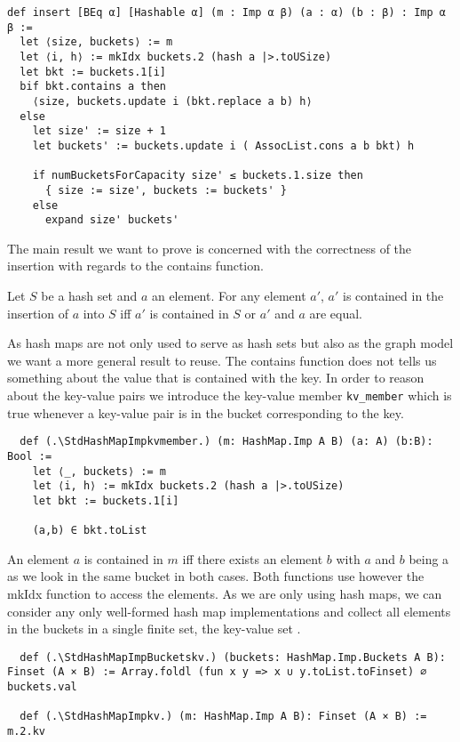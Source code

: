 \begin{lstlisting}
def insert [BEq α] [Hashable α] (m : Imp α β) (a : α) (b : β) : Imp α β :=
  let ⟨size, buckets⟩ := m
  let ⟨i, h⟩ := mkIdx buckets.2 (hash a |>.toUSize)
  let bkt := buckets.1[i]
  bif bkt.contains a then
    ⟨size, buckets.update i (bkt.replace a b) h⟩
  else
    let size' := size + 1
    let buckets' := buckets.update i ( AssocList.cons a b bkt) h

    if numBucketsForCapacity size' ≤ buckets.1.size then
      { size := size', buckets := buckets' }
    else
      expand size' buckets'
\end{lstlisting}

The main result we want to prove is concerned with the correctness of the insertion with regards to the contains function.

\begin{lemma}[\StdHashSetcontainsinsert]
  Let $S$ be a hash set and $a$ an element. For any element $a'$, $a'$ is contained in the insertion of $a$ into $S$ iff $a'$ is contained in $S$ or $a'$ and $a$ are equal.
\end{lemma}

As hash maps are not only used to serve as hash sets but also as the graph model we want a more general result to reuse. The contains function does not tells us something about the value that is contained with the key. In order to reason about the key-value pairs we introduce the key-value member \lstinline|kv_member| which is true whenever a key-value pair is in the bucket corresponding to the key.

\begin{lstlisting}
  def (.\StdHashMapImpkvmember.) (m: HashMap.Imp A B) (a: A) (b:B): Bool :=
    let ⟨_, buckets⟩ := m
    let ⟨i, h⟩ := mkIdx buckets.2 (hash a |>.toUSize)
    let bkt := buckets.1[i]

    (a,b) ∈ bkt.toList
\end{lstlisting}

An element $a$ is contained in $m$ iff there exists an element $b$ with $a$ and $b$ being a \StdHashMapImpkvmember as we look in the same bucket in both cases. Both functions use however the mkIdx function to access the elements. As we are only using hash maps, we can consider any only well-formed hash map implementations and collect all elements in the buckets in a single finite set, the key-value set \StdHashMapImpkv.

\begin{lstlisting}
  def (.\StdHashMapImpBucketskv.) (buckets: HashMap.Imp.Buckets A B): Finset (A × B) := Array.foldl (fun x y => x ∪ y.toList.toFinset) ∅ buckets.val

  def (.\StdHashMapImpkv.) (m: HashMap.Imp A B): Finset (A × B) := m.2.kv
\end{lstlisting}

